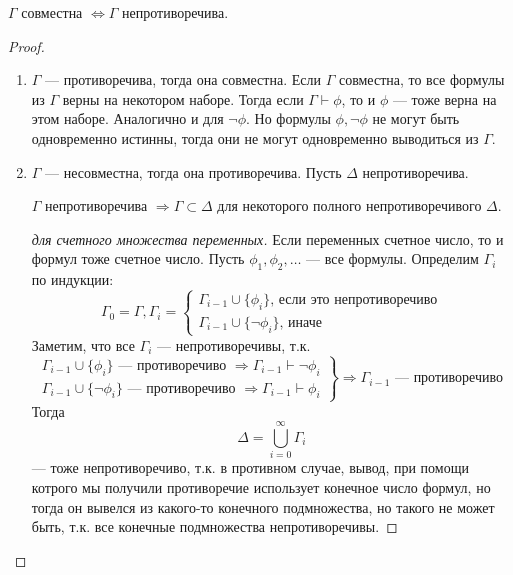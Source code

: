 \begin{theorem}
    $\Gamma$ совместна $\Leftrightarrow \Gamma$ непротиворечива.
\end{theorem}
\begin{proof}\indent
    \begin{enumerate}
        \item $\Gamma$ --- противоречива, тогда она совместна. Если $\Gamma$ совместна, то все формулы из $\Gamma$ верны на некотором наборе. Тогда если $\Gamma \vdash \phi$, то и $\phi$ --- тоже верна на этом наборе. Аналогично и для $\neg \phi$. Но формулы $\phi, \neg \phi$ не могут быть одновременно истинны, тогда они не могут одновременно выводиться из $\Gamma$.
        \item $\Gamma$ --- несовместна, тогда она противоречива. Пусть $\Delta$ непротиворечива. 
        \begin{lemma}
            $\Gamma$ непротиворечива $\Rightarrow \Gamma \subset \Delta$ для некоторого полного непротиворечивого $\Delta$.
        \end{lemma}
        \begin{proof}[для счетного множества переменных]
            Если переменных счетное число, то и формул тоже счетное число. Пусть $\phi_1, \phi_2, \dots$ --- все формулы. Определим $\Gamma_i$ по индукции:
            $$\Gamma_0 = \Gamma, \Gamma_i = \left\{\begin{array}{l}
                \Gamma_{i-1} \cup \{\phi_i\}\text{, если это непротиворечиво}  \\
                \Gamma_{i-1} \cup \{\neg\phi_i\} \text{, иначе}
            \end{array}\right.$$
            Заметим, что все $\Gamma_i$ --- непротиворечивы, т.к.
            $$\left.\begin{array}{l}
                \Gamma_{i-1} \cup \{\phi_i\}\text{ --- противоречиво } \Rightarrow \Gamma_{i-1}\vdash\neg\phi_i \\
                \Gamma_{i-1} \cup \{\neg\phi_i\} \text{ --- противоречиво }\Rightarrow \Gamma_{i-1}\vdash\phi_i
            \end{array}\right\} \Rightarrow \Gamma_{i-1}\text{ --- противоречиво }$$
            Тогда 
            $$\Delta = \bigcup_{i = 0}^{\infty}\Gamma_i$$
            --- тоже непротиворечиво, т.к. в противном случае, вывод, при помощи котрого мы получили противоречие использует конечное число формул, но тогда он вывелся из какого-то конечного подмножества, но такого не может быть, т.к. все конечные подмножества непротиворечивы.

\end{proof}
\end{enumerate}
\end{proof}
